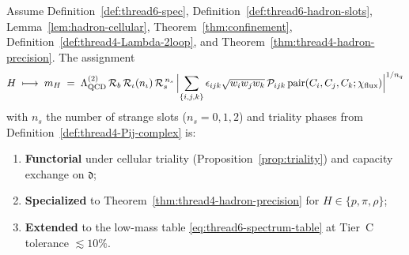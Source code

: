 \begin{theorem}
\label{thm:thread6-hadron}
Assume Definition~\ref{def:thread6-spec},
Definition~\ref{def:thread6-hadron-slots},
Lemma~\ref{lem:hadron-cellular}, Theorem~\ref{thm:confinement},
Definition~\ref{def:thread4-Lambda-2loop}, and
Theorem~\ref{thm:thread4-hadron-precision}. The assignment
\begin{equation}\label{eq:thread6-hadron-functor}
  H
  \;\longmapsto\;
  m_H
  \;=\;
  \Lambda_{\mathrm{QCD}}^{(2)}\,
  \mathcal{R}_b\,
  \mathcal{R}_\iota(n_\iota)\,
  \mathcal{R}_s^{\,n_s}\,
  \Bigl|\sum_{\{i,j,k\}}
  \epsilon_{ijk}\sqrt{w_iw_jw_k}\,
  \mathcal{P}_{ijk}\,
  \mathrm{pair}(C_i,C_j,C_k;\chi_{\mathrm{flux}})\Bigr|^{1/n_q}
\end{equation}
with $n_s$ the number of strange slots ($n_s=0,1,2$) and triality phases from
Definition~\ref{def:thread4-Pij-complex} is:
\begin{enumerate}[label=(\roman*),leftmargin=*]
  \item \textbf{Functorial} under cellular triality
    (Proposition~\ref{prop:triality}) and capacity exchange on $\mathfrak{d}$;
  \item \textbf{Specialized} to Theorem~\ref{thm:thread4-hadron-precision} for
    $H\in\{p,\pi,\rho\}$;
  \item \textbf{Extended} to the low-mass table
    \eqref{eq:thread6-spectrum-table} at Tier~C tolerance $\lesssim 10\%$.
\end{enumerate}
\end{theorem}

